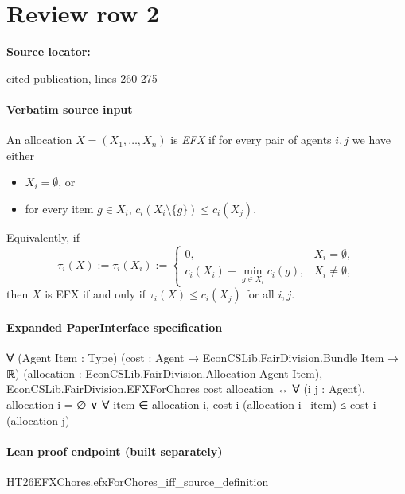 \documentclass[10pt]{article}
\begin{document}
\section*{Review row 2}
\textbf{Source locator:} {\footnotesize\raggedright cited publication, lines 260-\allowbreak{}275\par}
\paragraph{Verbatim source input}
\begin{ReviewVerbatim}
\begin{definition}
An allocation $X=(X_1,\ldots,X_n)$ is \emph{EFX} if for every pair of agents $i,j$ we have either
\begin{itemize}
    \item $X_i=\emptyset$, or
    \item for every item $g\in X_i$, $c_i(X_i\setminus\{g\})\le c_i(X_j).$
\end{itemize}
Equivalently, if
\[
    \tau_i(X):=\tau_i(X_i):=
    \begin{cases}
        0, & X_i=\emptyset,\\
        c_i(X_i)-\min_{g\in X_i}c_i(g), & X_i\ne\emptyset,
    \end{cases}
\]
then $X$ is EFX if and only if $\tau_i(X)\le c_i(X_j)$ for all $i,j$.
\end{definition}
\end{ReviewVerbatim}


\paragraph{Expanded PaperInterface specification}
\begin{ReviewVerbatim}
∀ (Agent Item : Type) (cost : Agent → EconCSLib.FairDivision.Bundle Item → ℝ)
  (allocation : EconCSLib.FairDivision.Allocation Agent Item),
  EconCSLib.FairDivision.EFXForChores cost allocation ↔
    ∀ (i j : Agent), allocation i = ∅ ∨ ∀ item ∈ allocation i, cost i (allocation i \ {item}) ≤ cost i (allocation j)
\end{ReviewVerbatim}

\paragraph{Lean proof endpoint (built separately)}\begin{ReviewVerbatim}
HT26EFXChores.efxForChores_iff_source_definition
\end{ReviewVerbatim}
\end{document}
